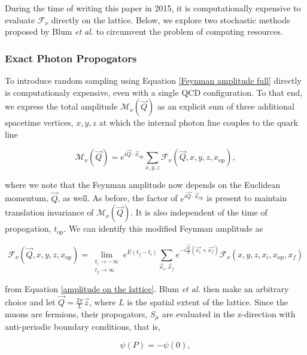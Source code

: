 \documentclass{article}
\numberwithin{equation}{section} %
\begin{document}
During the time of writing this paper \cite{blum} in 2015, it is computationally expensive to evaluate $\mathcal{F}_\nu$ directly on the lattice. Below, we explore two stochastic methods proposed by Blum \textit{et al.} to circumvent the problem of computing resources.

\subsubsection{Exact Photon Propogators}

To introduce random sampling using Equation \ref{Feynman amplitude full} directly is computationaly expensive, even with a single QCD configuration. To that end, we express the total amplitude $\mathcal{M}_\nu(\vec{Q})$ as an explicit sum of three additional spacetime vertices, $x,y,z$ at which the internal photon line couples to the quark line 

\begin{equation}
\mathcal{M}_\nu(\vec{Q}) = e^{i\vec{Q}\cdot\vec{x}_\mathrm{op}} \sum_{x,y,z} \mathcal{F}_\nu(\vec{Q},x,y,z,x_\mathrm{op}),
\label{total amplitude with spacetime}
\end{equation}

\noindent where we note that the Feynman amplitude now depends on the Euclidean momentum, $\vec{Q}$, as well. As before, the factor of $e^{i\vec{Q}\cdot\vec{x}_\mathrm{op}}$ is present to maintain translation invariance of $\mathcal{M}_\nu(\vec{Q})$. It is also independent of the time of propogation, $t_\mathrm{op}$. We can identify this modified Feynman amplitude as 

\begin{equation}
\mathcal{F}_\nu(\vec{Q},x,y,z,x_\mathrm{op}) = \lim_{\substack{t_i\rightarrow -\infty\\t_f \rightarrow \infty}} e^{E(t_f-t_i)} \sum_{\vec{x}_i,\vec{x}_f}e^{-i\frac{\vec{Q}}{2}(\vec{x_i}+\vec{x_f})} \mathcal{F}_\nu(x,y,z,x_i,x_\mathrm{op}, x_f)
\end{equation}

\noindent from Equation \ref{amplitude on the lattice}. Blum \textit{et al.} then make an arbitrary choice and let $\vec{Q} = \frac{2\pi}{L}\vec{z}$, where $L$ is the spatial extent of the lattice. Since the muons are fermions, their propogators, $S_\mu$ are evaluated in the z-direction with anti-periodic boundary conditions, that is,

\begin{equation}
\psi(P) = -\psi(0),
\end{equation}
\end{document}
